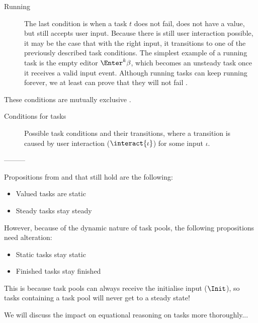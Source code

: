 \begin{description}
  \item[Running]
    The last condition is when a task $t$ does not fail, does not have a value, but still accepts user input.
    Because there is still user interaction possible, it may be the case that with the right input, it transitions to one of the previously described task conditions.
    The simplest example of a running task is the empty editor $\Enter^k \beta$, which becomes an unsteady task once it receives a valid input event.
    Although running tasks can keep running forever,
    we at least can prove that they will not fail .

\end{description}

These conditions are mutually exclusive .

\begin{table}
  
  \caption{Conditions for tasks}
  \label{tab:task-conditions}
\end{table}

\begin{figure}
  
  \caption{Possible task conditions and their transitions, where a transition is caused by user interaction ($\interact{\iota}$) for some input $\iota$.}
  \label{fig:task-conditions}
\end{figure}


---------






Propositions from \cite{Steenvoorden22} and \cite{Klijnsma2020} that still hold are the following:

\begin{itemize}
  \item Valued tasks are static
  \item Steady tasks stay steady
\end{itemize}

However, because of the dynamic nature of task pools, the following propositions need alteration:

\begin{itemize}
  \item Static tasks stay static
  \item Finished tasks stay finished
\end{itemize}

This is because task pools can always receive the initialise input ($\Init$),
so tasks containing a task pool will never get to a steady state!

We will discuss the impact on equational reasoning on tasks more thoroughly...
